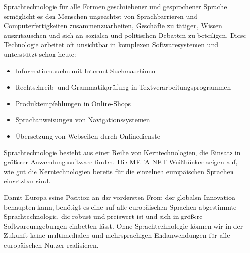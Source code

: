 \documentclass[]{../../metanetpaper}
\begin{document}
\begin{Parallel}[c]{79mm}{78mm}
{Sprachtechnologie für alle Formen geschriebener und gesprochener Sprache ermöglicht es den Menschen ungeachtet von Sprachbarrieren und Computerfertigkeiten zusammenzuarbeiten, Geschäfte zu tätigen, Wissen auszutauschen und sich an sozialen und politischen Debatten zu beteiligen. Diese Technologie arbeitet oft unsichtbar in komplexen Softwaresystemen und unterstützt schon heute:
    \begin{itemize}
      \item Informationssuche mit Internet-Suchmaschinen
      \item Rechtschreib- und Grammatikprüfung in Textverarbeitungsprogrammen
      \item Produktempfehlungen in Online-Shops
      \item Sprachanweisungen von Na\-vi\-ga\-tions\-sys\-te\-men
      \item Übersetzung von Webseiten durch Onlinedienste
    \end{itemize}
Sprachtechnologie besteht aus einer Reihe von Kerntechnologien, die Einsatz in größerer Anwendungssoftware finden. Die META-NET Weißbücher zeigen auf, wie gut die Kerntechnologien bereits für die einzelnen europäischen Sprachen einsetzbar sind. 

Damit Europa seine Position an der vordersten Front der globalen Innovation behaupten kann, benötigt es eine auf alle europäischen Sprachen abgestimmte Sprachtechnologie, die robust und preiswert ist und sich in größere Softwareumgebungen einbetten lässt. Ohne Sprachtechnologie können wir in der Zukunft keine multimedialen und mehrsprachigen Endanwendungen für alle europäischen Nutzer realisieren. 
  }

\end{Parallel}
\end{document}
